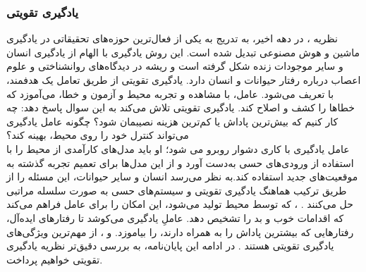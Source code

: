 \subsubsection{یادگیری تقویتی}
نظریه 
\textit{}
،
در دهه اخیر، به تدریج به یکی از فعال‌ترین حوزه‌های تحقیقاتی در یادگیری ماشین و هوش مصنوعی تبدیل شده است. این روش یادگیری با الهام از یادگیری انسان و سایر موجودات زنده شکل گرفته است و ریشه در دیدگاه‌های روانشناختی و علوم اعصاب درباره رفتار حیوانات و انسان دارد. یادگیری تقویتی از طریق تعامل یک 
\textit{
}
هدفمند،
با 
\textit{}
تعریف می‌شود. عامل، با مشاهده و تجربه محیط و آزمون و خطا، می‌‌آموزد که خطاها را کشف و اصلاح کند. یادگیری تقویتی تلاش می‌کند به این سوال پاسخ دهد: چه کار کنیم که بیش‌ترین پاداش یا کم‌ترین هزینه نصیبمان شود؟ چگونه عامل یادگیری می‌تواند کنترل خود را روی محیط، بهینه کند؟ 
\\عامل یادگیری با کاری دشوار روبرو می شود؛ او باید مدل‌های کارآمدی از محیط را با استفاده از ورودی‌های حسی به‌دست آورد و از این مدل‌ها برای تعمیم تجربه گذشته به موقعیت‌های جدید استفاده کند.به نظر می‌رسد انسان و سایر حیوانات، این مسئله را از طریق ترکیب هماهنگ یادگیری تقویتی و سیستم‌های حسی به صورت سلسله مراتبی حل می‌کنند
\cite{suttonbook}.
 \textit{}
،
که توسط محیط تولید می‌شود، این امکان را برای عامل فراهم می‌کند که اقدامات خوب و بد را تشخیص دهد. عاملِ یادگیری می‌کوشد تا رفتارهای ایده‌آل، رفتارهایی که بیشترین پاداش را به همراه دارند، را  بیاموزد.  و ، از مهم‌ترین ویژگی‌های یادگیری تقویتی هستند
\cite{mldef}.
در ادامه این پایان‌نامه، به بررسی دقیق‌تر نظریه یادگیری تقویتی خواهیم پرداخت. 
 


